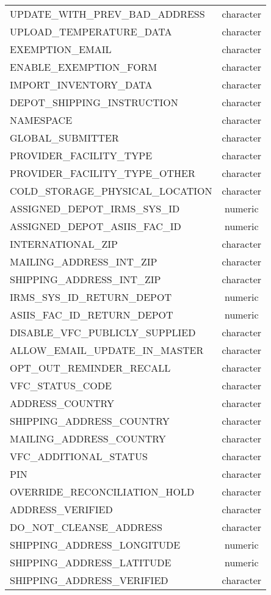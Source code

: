 \documentclass[
  letterpaper,
  DIV=11,
  numbers=noendperiod]{scrreprt}
\begin{document}
\begin{longtable}{lc}
UPDATE\_WITH\_PREV\_BAD\_ADDRESS & character \\ 
UPLOAD\_TEMPERATURE\_DATA & character \\ 
EXEMPTION\_EMAIL & character \\ 
ENABLE\_EXEMPTION\_FORM & character \\ 
IMPORT\_INVENTORY\_DATA & character \\ 
DEPOT\_SHIPPING\_INSTRUCTION & character \\ 
NAMESPACE & character \\ 
GLOBAL\_SUBMITTER & character \\ 
PROVIDER\_FACILITY\_TYPE & character \\ 
PROVIDER\_FACILITY\_TYPE\_OTHER & character \\ 
COLD\_STORAGE\_PHYSICAL\_LOCATION & character \\ 
ASSIGNED\_DEPOT\_IRMS\_SYS\_ID & numeric \\ 
ASSIGNED\_DEPOT\_ASIIS\_FAC\_ID & numeric \\ 
INTERNATIONAL\_ZIP & character \\ 
MAILING\_ADDRESS\_INT\_ZIP & character \\ 
SHIPPING\_ADDRESS\_INT\_ZIP & character \\ 
IRMS\_SYS\_ID\_RETURN\_DEPOT & numeric \\ 
ASIIS\_FAC\_ID\_RETURN\_DEPOT & numeric \\ 
DISABLE\_VFC\_PUBLICLY\_SUPPLIED & character \\ 
ALLOW\_EMAIL\_UPDATE\_IN\_MASTER & character \\ 
OPT\_OUT\_REMINDER\_RECALL & character \\ 
VFC\_STATUS\_CODE & character \\ 
ADDRESS\_COUNTRY & character \\ 
SHIPPING\_ADDRESS\_COUNTRY & character \\ 
MAILING\_ADDRESS\_COUNTRY & character \\ 
VFC\_ADDITIONAL\_STATUS & character \\ 
PIN & character \\ 
OVERRIDE\_RECONCILIATION\_HOLD & character \\ 
ADDRESS\_VERIFIED & character \\ 
DO\_NOT\_CLEANSE\_ADDRESS & character \\ 
SHIPPING\_ADDRESS\_LONGITUDE & numeric \\ 
SHIPPING\_ADDRESS\_LATITUDE & numeric \\ 
SHIPPING\_ADDRESS\_VERIFIED & character \\ 

\end{longtable}
\end{document}
